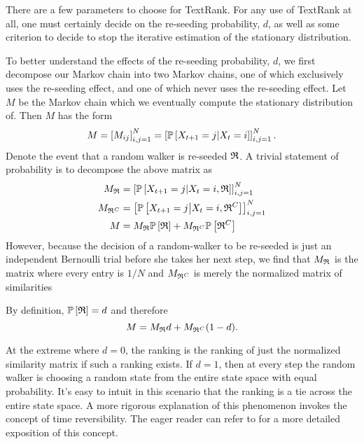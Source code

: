 There are a few parameters to choose for TextRank.
For any use of TextRank at all, one must certainly decide on the re-seeding probability, $d$, as well as some criterion to decide to stop the iterative estimation of the stationary distribution.

To better understand the effects of the re-seeding probability, $d$, we first decompose our Markov chain into two Markov chains, one of which exclusively uses the re-seeding effect, and one of which never uses the re-seeding effect.
Let $M$ be the Markov chain which we eventually compute the stationary distribution of.
Then $M$ has the form
\begin{equation*}
  M = \left[ M_{ij} \right]_{i,j=1}^N = \left[ \mathbb{P} \left[ X_{t+1} = j \middle| X_t = i \right] \right]_{i,j=1}^N.
\end{equation*}
Denote the event that a random walker is re-seeded $\frak{R}$. 
A trivial statement of probability is to decompose the above matrix as
\begin{equation*}
  \begin{aligned}
    M_{\frak{R}} &= \left[ \mathbb{P} \left[ X_{t+1} = j \middle| X_t = i, \frak{R} \right] \right]_{i,j=1}^N \\
    M_{\frak{R}^C} &= \left[ \mathbb{P} \left[ X_{t+1} = j \middle| X_t = i, \frak{R}^C \right] \right]_{i,j=1}^N \\
    M &=  M_{\frak{R}} \mathbb{P} \left[ \frak{R} \right]  +  M_{\frak{R}^C} \mathbb{P} \left[ \frak{R}^C \right]     
  \end{aligned}
\end{equation*}
However, because the decision of a random-walker to be re-seeded is just an independent Bernoulli trial before she takes her next step, we find that $M_{\frak{R}}$ is the matrix where every entry is $1/N$ and $M_{\frak{R}^C}$ is merely the normalized matrix of similarities

By definition, $\mathbb{P} \left[ \frak{R} \right] = d$ and therefore
\begin{equation*}
  M =  M_{\frak{R}} d  +  M_{\frak{R}^C} (1-d).
\end{equation*}

At the extreme where $d=0$, the ranking is the ranking of just the normalized similarity matrix if such a ranking exists.
If $d=1$, then at every step the random walker is choosing a random state from the entire state space with equal probability.
It's easy to intuit in this scenario that the ranking is a tie across the entire state space.
A more rigorous explanation of this phenomenon invokes the concept of time reversibility. 
The eager reader can refer to \cite{intro-prob-models-ross} for a more detailed exposition of this concept.

